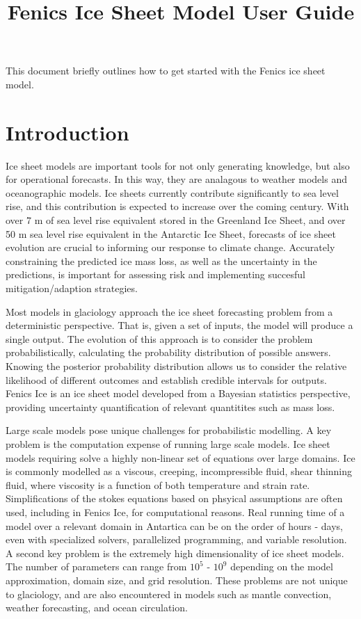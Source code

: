 \documentclass[11pt, reqno, nocenter]{article}
\title{Fenics Ice Sheet Model User Guide}
\begin{document}
\maketitle

This document briefly outlines how to get started with the Fenics ice sheet model. 

\tableofcontents 


\section{Introduction}


Ice sheet models are important tools for not only generating knowledge, but also for operational forecasts. In this way, they are analagous to weather models and oceanographic models. Ice sheets currently contribute significantly to sea level rise, and this contribution is expected to increase over the coming century. With over 7 \si{\metre} of sea level rise equivalent stored in the Greenland Ice Sheet, and over 50 \si{\metre} sea level rise equivalent in the Antarctic Ice Sheet, forecasts of ice sheet evolution are crucial to informing our response to climate change.  Accurately constraining the predicted ice mass loss, as well as the uncertainty in the predictions, is important for assessing risk and implementing succesful mitigation/adaption strategies.

Most models in glaciology approach the ice sheet forecasting problem from a deterministic perspective. That is, given a set of inputs, the model will produce a single output. The evolution of this approach is to consider the problem probabilistically, calculating the probability distribution of possible answers. Knowing the posterior probability distribution allows us to consider the relative likelihood of different outcomes and establish credible intervals for outputs. Fenics Ice is an ice sheet model developed from a Bayesian statistics perspective, providing uncertainty quantification of relevant quantitites such as mass loss.

Large scale models pose unique challenges for probabilistic modelling. A key problem is the computation expense of running large scale models. Ice sheet models requiring solve a highly non-linear set of equations over large domains. Ice is commonly modelled as a viscous, creeping, incompressible fluid, shear thinning fluid, where viscosity is a function of both temperature and strain rate. Simplifications of the stokes equations based on phsyical assumptions are often used, including in Fenics Ice, for computational reasons.  Real running time of a model over a relevant domain in Antartica can be on the order of hours - days, even with specialized solvers, parallelized programming, and variable resolution. A second key problem is the extremely high dimensionality of ice sheet models. The number of parameters can range from $10^5$ - $10^9$ depending on the model approximation, domain size, and grid resolution. These problems are not unique to glaciology, and are also encountered in models such as mantle convection, weather forecasting, and ocean circulation. 
\end{document}
